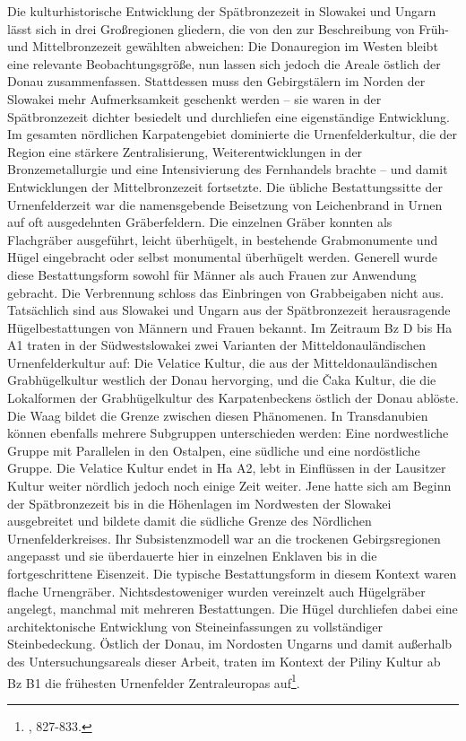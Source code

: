 \documentclass[openany,twoside,twocolumn]{book}
\let\rmarkdownfootnote\footnote%
\def\footnote{\protect\rmarkdownfootnote}
\begin{document}
Die kulturhistorische Entwicklung der Spätbronzezeit in Slowakei und
Ungarn lässt sich in drei Großregionen gliedern, die von den zur
Beschreibung von Früh- und Mittelbronzezeit gewählten abweichen: Die
Donauregion im Westen bleibt eine relevante Beobachtungsgröße, nun
lassen sich jedoch die Areale östlich der Donau zusammenfassen.
Stattdessen muss den Gebirgstälern im Norden der Slowakei mehr
Aufmerksamkeit geschenkt werden -- sie waren in der Spätbronzezeit
dichter besiedelt und durchliefen eine eigenständige Entwicklung. Im
gesamten nördlichen Karpatengebiet dominierte die Urnenfelderkultur, die
der Region eine stärkere Zentralisierung, Weiterentwicklungen in der
Bronzemetallurgie und eine Intensivierung des Fernhandels brachte -- und
damit Entwicklungen der Mittelbronzezeit fortsetzte. Die übliche
Bestattungssitte der Urnenfelderzeit war die namensgebende Beisetzung
von Leichenbrand in Urnen auf oft ausgedehnten Gräberfeldern. Die
einzelnen Gräber konnten als Flachgräber ausgeführt, leicht überhügelt,
in bestehende Grabmonumente und Hügel eingebracht oder selbst monumental
überhügelt werden. Generell wurde diese Bestattungsform sowohl für
Männer als auch Frauen zur Anwendung gebracht. Die Verbrennung schloss
das Einbringen von Grabbeigaben nicht aus. Tatsächlich sind aus Slowakei
und Ungarn aus der Spätbronzezeit herausragende Hügelbestattungen von
Männern und Frauen bekannt. Im Zeitraum Bz D bis Ha A1 traten in der
Südwestslowakei zwei Varianten der Mitteldonauländischen
Urnenfelderkultur auf: Die Velatice Kultur, die aus der
Mitteldonauländischen Grabhügelkultur westlich der Donau hervorging, und
die Čaka Kultur, die die Lokalformen der Grabhügelkultur des
Karpatenbeckens östlich der Donau ablöste. Die Waag bildet die Grenze
zwischen diesen Phänomenen. In Transdanubien können ebenfalls mehrere
Subgruppen unterschieden werden: Eine nordwestliche Gruppe mit
Parallelen in den Ostalpen, eine südliche und eine nordöstliche Gruppe.
Die Velatice Kultur endet in Ha A2, lebt in Einflüssen in der Lausitzer
Kultur weiter nördlich jedoch noch einige Zeit weiter. Jene hatte sich
am Beginn der Spätbronzezeit bis in die Höhenlagen im Nordwesten der
Slowakei ausgebreitet und bildete damit die südliche Grenze des
Nördlichen Urnenfelderkreises. Ihr Subsistenzmodell war an die trockenen
Gebirgsregionen angepasst und sie überdauerte hier in einzelnen Enklaven
bis in die fortgeschrittene Eisenzeit. Die typische Bestattungsform in
diesem Kontext waren flache Urnengräber. Nichtsdestoweniger wurden
vereinzelt auch Hügelgräber angelegt, manchmal mit mehreren
Bestattungen. Die Hügel durchliefen dabei eine architektonische
Entwicklung von Steineinfassungen zu vollständiger Steinbedeckung.
Östlich der Donau, im Nordosten Ungarns und damit außerhalb des
Untersuchungsareals dieser Arbeit, traten im Kontext der Piliny Kultur
ab Bz B1 die frühesten Urnenfelder Zentraleuropas auf\footnote{\textcite{markova_slovakia_2013},
  827-833.}.
\end{document}
